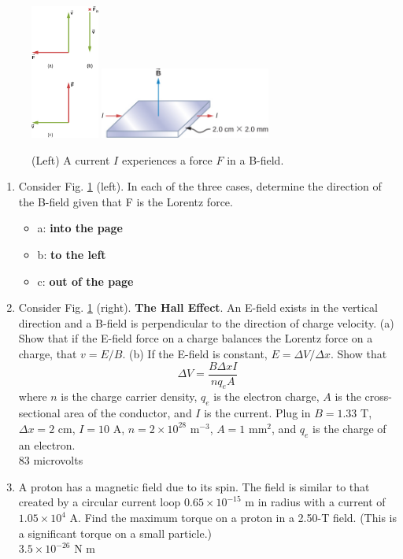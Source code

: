 \documentclass[10pt]{article}
\begin{document}
\begin{figure}
\centering
\includegraphics[width=0.2\textwidth]{bfield1.jpeg} \hspace{0.5cm}
\includegraphics[width=0.5\textwidth]{hallEffect1.jpeg}
\caption{\label{fig:chap11_1} (Left) A current $I$ experiences a force $F$ in a B-field.}
\end{figure}

\begin{enumerate}
\item Consider Fig. \ref{fig:chap11_1} (left).  In each of the three cases, determine the direction of the B-field given that F is the Lorentz force.
\begin{itemize}
\item a: \textbf{into the page}
\item b: \textbf{to the left}
\item c: \textbf{out of the page}
\end{itemize}
\item Consider Fig. \ref{fig:chap11_1} (right).  \textbf{The Hall Effect}.  An E-field exists in the vertical direction and a B-field is perpendicular to the direction of charge velocity.  (a) Show that if the E-field force on a charge balances the Lorentz force on a charge, that $v = E/B$. (b) If the E-field is constant, $E = \Delta V/\Delta x$.  Show that
\begin{equation}
\Delta V = \frac{B\Delta x I}{n q_e A}
\end{equation}
where $n$ is the charge carrier density, $q_e$ is the electron charge, $A$ is the cross-sectional area of the conductor, and $I$ is the current.  Plug in $B = 1.33$ T, $\Delta x = 2$ cm, $I = 10$ A, $n = 2 \times 10^{28}$ m$^{-3}$, $A = 1$ mm$^2$, and $q_e$ is the charge of an electron. \\

83 microvolts

\item A proton has a magnetic field due to its spin. The field is similar to that created by a circular current loop $0.65 \times 10^{-15}$ m in radius with a current of $1.05 \times 10^{4}$ A.  Find the maximum torque on a proton in a 2.50-T field. (This is a significant torque on a small particle.) \\ 

$3.5 \times 10^{-26}$ N m

\end{enumerate}
\end{document}
